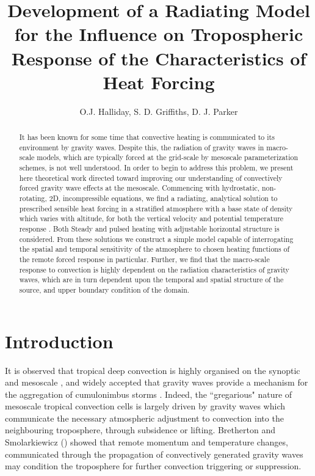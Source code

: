\documentclass[a4paper,10pt]{article}
\title{Development of a Radiating Model for the Influence on Tropospheric Response of the Characteristics of Heat Forcing }
\author{O.J. Halliday, S. D. Griffiths, D. J. Parker}
\begin{document}
\maketitle

\begin{abstract}
It has been known for some time that convective heating is communicated to its environment by gravity waves. Despite this, the radiation of gravity waves in macro-scale models, which are typically forced at the grid-scale by mesoscale parameterization schemes, is not well understood. In order to begin to address this problem, we present here theoretical work directed toward improving our understanding of convectively forced gravity wave effects at the mesoscale. Commencing with hydrostatic, non-rotating, 2D, incompressible equations, we find a radiating, analytical solution to prescribed sensible heat forcing in a stratified atmosphere with a base state of density which varies with altitude, for both the vertical velocity and potential temperature response . Both Steady and pulsed heating with adjustable horizontal structure is considered. From these solutions we construct a simple model capable of interrogating the spatial and temporal sensitivity of the atmosphere to chosen heating functions of the remote forced response in particular. Further, we find that the macro-scale response to convection is highly dependent on the radiation characteristics of gravity waves, which are in turn dependent upon the temporal and spatial structure of the source, and upper boundary condition of the domain.
\end{abstract}
%
%
%
\section{Introduction}
\label{sec_Intro}
%
It is observed that tropical deep convection is highly organised on the synoptic and mesoscale \citep{wheeler1999convectively}, and widely accepted that gravity waves provide a mechanism for the aggregation of cumulonimbus storms \citep{tulich2011convectively}. Indeed, the ``gregarious" nature of mesoscale tropical convection cells is largely driven by gravity waves \citep{mapes1993gregarious} which communicate the necessary atmospheric adjustment to convection into the neighbouring troposphere, through subsidence or lifting. Bretherton and Smolarkiewicz (\citeyear{bretherton1989gravity}) showed that remote momentum and temperature changes, communicated through the propagation of convectively generated gravity waves may condition the troposphere for further convection triggering or suppression. 
\end{document}
